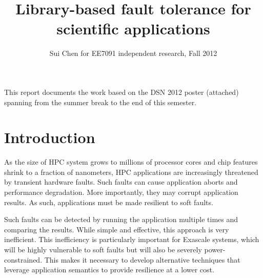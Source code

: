 \documentclass{article}
\title{Library-based fault tolerance for scientific applications}
\author{Sui Chen for EE7091 independent research, Fall 2012}
\begin{document}
\maketitle











This report documents the work based on the DSN 2012 poster (attached) spanning from the summer break to the end of this semester.

\section{Introduction}

As the size of HPC system grows to millions of processor cores and chip features shrink to a fraction of nanometers, HPC applications are increasingly threatened by transient hardware faults. Such faults can cause application aborts and performance degradation. More importantly, they may corrupt application results. As such, applications must be
made resilient to soft faults.

Such faults can be detected by running the application multiple
times and comparing the results. While simple and effective,
this approach is very inefficient. This inefficiency is
particularly important for Exascale systems, which will be
highly vulnerable to soft faults but will also be severely power-
constrained. This makes it necessary to develop alternative
techniques that leverage application semantics to provide
resilience at a lower cost.
\end{document}
